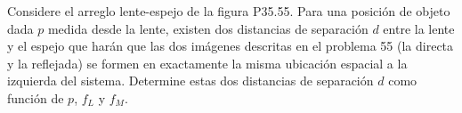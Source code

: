 \item Considere el arreglo lente-espejo de la figura P35.55. Para una posición de objeto dada $p$ medida desde la lente, existen dos distancias de separación $d$ entre la lente y el espejo que harán que las dos imágenes descritas en el problema 55 (la directa y la reflejada) se formen en exactamente la misma ubicación espacial a la izquierda del sistema. Determine estas dos distancias de separación $d$ como función de $p$, $f_L$ y $f_M$.